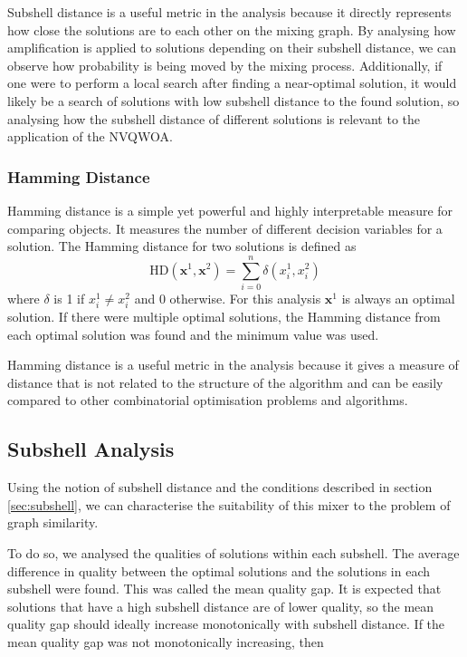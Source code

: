 Subshell distance is a useful metric in the analysis because it directly represents how close the solutions are to each other on the mixing graph. By analysing how amplification is applied to solutions depending on their subshell distance, we can observe how probability is being moved by the mixing process. Additionally, if one were to perform a local search after finding a near-optimal solution, it would likely be a search of solutions with low subshell distance to the found solution, so analysing how the subshell distance of different solutions is relevant to the application of the NVQWOA.

    \subsubsection{Hamming Distance}
Hamming distance is a simple yet powerful and highly interpretable measure for comparing objects. It measures the number of different decision variables for a solution. The Hamming distance for two solutions is defined as 
$$\text{HD}(\mathbf{x}^1,\mathbf{x}^2)=\sum_{i=0}^n \delta(x^1_i,x^2_i)$$
where $\delta$ is 1 if $x^1_i\neq x^2_i$ and 0 otherwise. For this analysis $\mathbf{x}^1$ is always an optimal solution. If there were multiple optimal solutions, the Hamming distance from each optimal solution was found and the minimum value was used.

Hamming distance is a useful metric in the analysis because it gives a measure of distance that is not related to the structure of the algorithm and can be easily compared to other combinatorial optimisation problems and algorithms.

    \subsection{Subshell Analysis}
Using the notion of subshell distance and the conditions described in section \ref{sec:subshell}, we can characterise the suitability of this mixer to the problem of graph similarity. 

To do so, we analysed the qualities of solutions within each subshell. The average difference in quality between the optimal solutions and the solutions in each subshell were found. This was called the mean quality gap. It is expected that solutions that have a high subshell distance are of lower quality, so the mean quality gap should ideally increase monotonically with subshell distance. If the mean quality gap was not monotonically increasing, then 


